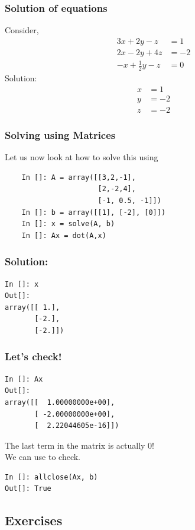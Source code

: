 \documentclass[14pt,compress]{beamer}
\newcounter{time}
\newcommand{\inctime}[1]{\addtocounter{time}{#1}{\tiny \thetime\ m}}
\newcommand{\kwrd}[1]{ \texttt{\textbf{\color{blue}{#1}}}  }
\begin{document}
\begin{frame}[fragile]
\frametitle{Solution of equations}
Consider,
  \begin{align*}
    3x + 2y - z  & = 1 \\
    2x - 2y + 4z  & = -2 \\
    -x + \frac{1}{2}y -z & = 0
  \end{align*}
Solution:
  \begin{align*}
    x & = 1 \\
    y & = -2 \\
    z & = -2
  \end{align*}
\end{frame}

\begin{frame}[fragile]
\frametitle{Solving using Matrices}
Let us now look at how to solve this using \kwrd{matrices}
  \begin{lstlisting}
    In []: A = array([[3,2,-1],
                      [2,-2,4],                   
                      [-1, 0.5, -1]])
    In []: b = array([[1], [-2], [0]])
    In []: x = solve(A, b)
    In []: Ax = dot(A,x)
  \end{lstlisting}
\end{frame}

\begin{frame}[fragile]
\frametitle{Solution:}
\begin{lstlisting}
In []: x
Out[]: 
array([[ 1.],
       [-2.],
       [-2.]])
\end{lstlisting}
\end{frame}

\begin{frame}[fragile]
\frametitle{Let's check!}
\begin{lstlisting}
In []: Ax
Out[]: 
array([[  1.00000000e+00],
       [ -2.00000000e+00],
       [  2.22044605e-16]])
\end{lstlisting}
\begin{block}{}
The last term in the matrix is actually \alert{0}!\\
We can use \kwrd{allclose()} to check.
\end{block}
\begin{lstlisting}
In []: allclose(Ax, b)
Out[]: True
\end{lstlisting}
\inctime{15}
\end{frame}

\subsection{Exercises}
\end{document}
